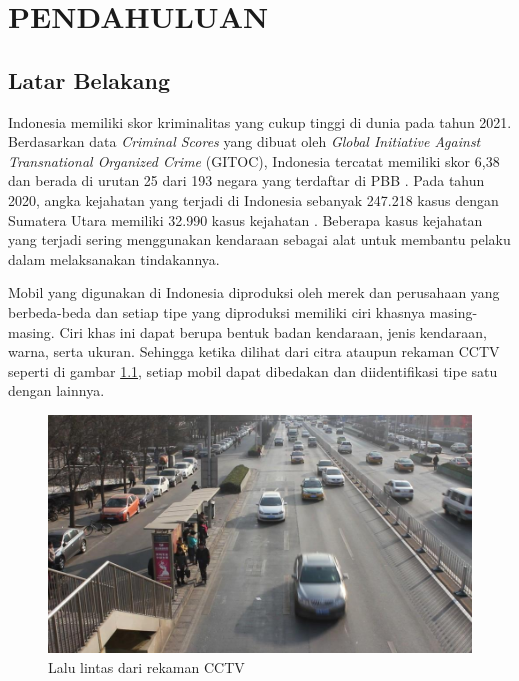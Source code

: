 \chapter{PENDAHULUAN}
\label{chap:pendahuluan}

\section{Latar Belakang}
\label{sec:latarbelakang}

Indonesia memiliki skor kriminalitas yang cukup tinggi di dunia pada tahun 2021. \linebreak
Berdasarkan data \emph{Criminal Scores} yang dibuat oleh \emph{Global Initiative Against Transnational Organized Crime} 
(GITOC), Indonesia tercatat memiliki skor 6,38 dan berada di urutan 25 dari 193 negara yang 
terdaftar di PBB \parencite{Gitoc2021}. Pada tahun 2020, angka kejahatan yang terjadi di Indonesia 
sebanyak 247.218 kasus dengan Sumatera Utara memiliki 32.990 kasus kejahatan \parencite{Bpskriminal2021}.
Beberapa kasus kejahatan yang terjadi sering menggunakan kendaraan sebagai alat untuk membantu pelaku 
dalam melaksanakan tindakannya.

Mobil yang digunakan di Indonesia diproduksi oleh merek dan perusahaan yang berbeda-beda 
dan setiap tipe yang diproduksi memiliki ciri khasnya masing-masing. Ciri khas ini dapat 
berupa bentuk badan kendaraan, jenis kendaraan, warna, serta ukuran. Sehingga ketika dilihat 
dari citra ataupun rekaman CCTV seperti di gambar \ref{fig:RekamanCCTV}, setiap mobil dapat 
dibedakan dan diidentifikasi tipe satu dengan lainnya.


\begin{figure}[ht]
      \centering
      \includegraphics[scale=0.3]{gambar/Mobil.jpg}
      \caption{Lalu lintas dari rekaman CCTV}
      \label{fig:RekamanCCTV}
\end{figure}


